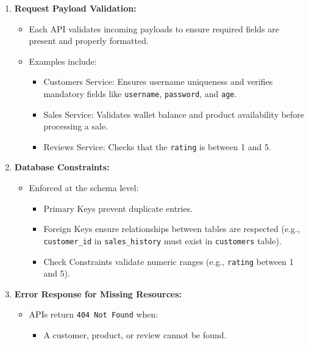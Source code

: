 \documentclass[a4paper,12pt]{article}
\begin{document}
\begin{enumerate}
    \item \textbf{Request Payload Validation:}
    \begin{itemize}
        \item Each API validates incoming payloads to ensure required fields are present and properly formatted.
        \item Examples include:
        \begin{itemize}
            \item Customers Service: Ensures username uniqueness and verifies mandatory fields like \texttt{username}, \texttt{password}, and \texttt{age}.
            \item Sales Service: Validates wallet balance and product availability before processing a sale.
            \item Reviews Service: Checks that the \texttt{rating} is between 1 and 5.
        \end{itemize}
    \end{itemize}

    \item \textbf{Database Constraints:}
    \begin{itemize}
        \item Enforced at the schema level:
        \begin{itemize}
            \item Primary Keys prevent duplicate entries.
            \item Foreign Keys ensure relationships between tables are respected (e.g., \texttt{customer\_id} in \texttt{sales\_history} must exist in \texttt{customers} table).
            \item Check Constraints validate numeric ranges (e.g., \texttt{rating} between 1 and 5).
        \end{itemize}
    \end{itemize}

    \item \textbf{Error Response for Missing Resources:}
    \begin{itemize}
        \item APIs return \texttt{404 Not Found} when:
        \begin{itemize}
            \item A customer, product, or review cannot be found.
        \end{itemize}
    \end{itemize}


\end{enumerate}
\end{document}
